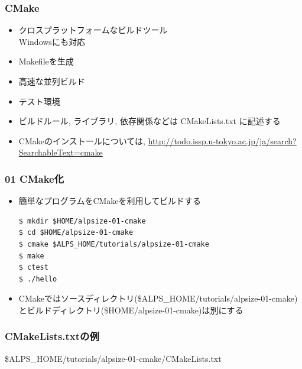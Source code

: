 \begin{frame}
  \frametitle{CMake}
  \begin{itemize}
    \setlength{\itemsep}{1em}
  \item クロスプラットフォームなビルドツール \\
    Windowsにも対応
  \item Makefileを生成
  \item 高速な並列ビルド
  \item テスト環境
  \item ビルドルール, ライブラリ, 依存関係などは CMakeLists.txt に記述する
  \item CMakeのインストールについては, \url{http://todo.issp.u-tokyo.ac.jp/ja/search?SearchableText=cmake}
  \end{itemize}
\end{frame}

\begin{frame}[c,fragile]
  \frametitle{01 CMake化}
  \begin{itemize}
    \setlength{\itemsep}{1em}
  \item 簡単なプログラムをCMakeを利用してビルドする
\begin{lstlisting}
$ mkdir $HOME/alpsize-01-cmake
$ cd $HOME/alpsize-01-cmake
$ cmake $ALPS_HOME/tutorials/alpsize-01-cmake
$ make
$ ctest
$ ./hello
\end{lstlisting}
  \item {\color{red} CMakeではソースディレクトリ(\$ALPS\_HOME/tutorials/alpsize-01-cmake)とビルドディレクトリ(\$HOME/alpsize-01-cmake)は別にする}
  \end{itemize}
\end{frame}

\begin{frame}[fragile,shrink=15]
  \frametitle{CMakeLists.txtの例}
  {\small \$ALPS\_HOME/tutorials/alpsize-01-cmake/CMakeLists.txt}
\end{frame}

